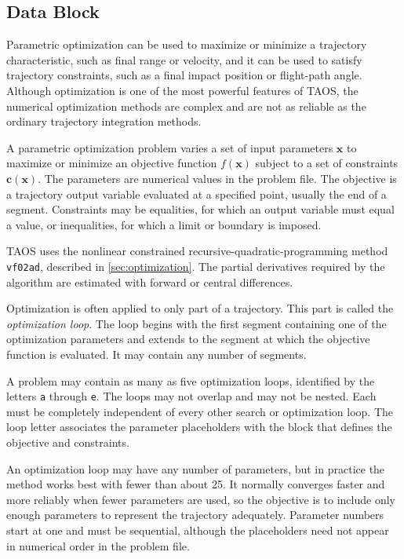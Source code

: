 \subsection{ Data Block}\label{sec:block-optimize}

Parametric optimization can be used to maximize or minimize a trajectory
characteristic, such as final range or velocity, and it can be used to satisfy
trajectory constraints, such as a final impact position or flight-path angle.
Although optimization is one of the most powerful features of TAOS, the numerical
optimization methods are complex and are not as reliable as the ordinary trajectory
integration methods.

A parametric optimization problem varies a set of input parameters
$\boldsymbol{x}$ to maximize or minimize an objective function
$f(\boldsymbol{x})$ subject to a set of constraints
$\boldsymbol{c}(\boldsymbol{x})$.  The parameters are numerical values in the
problem file.  The objective is a trajectory output variable evaluated at a specified
point, usually the end of a segment.  Constraints may be equalities, for which an
output variable must equal a value, or inequalities, for which a limit or boundary is
imposed.

TAOS uses the nonlinear constrained recursive-quadratic-programming method
\texttt{vf02ad}, described in \cref{sec:optimization}.  The partial
derivatives required by the algorithm are estimated with forward or central
differences.


Optimization is often applied to only part of a trajectory.  This part is called the
\emph{optimization loop}.  The loop begins with the first segment containing one of
the optimization parameters and extends to the segment at which the objective
function is evaluated.  It may contain any number of segments.

A problem may contain as many as five optimization loops, identified by the letters
\texttt{a} through \texttt{e}.  The loops may not overlap and may not be nested.
Each must be completely independent of every other search or optimization loop.
The loop letter associates the parameter placeholders with the
 block that defines the objective and constraints.

An optimization loop may have any number of parameters, but in practice the method
works best with fewer than about 25.  It normally converges faster and more reliably
when fewer parameters are used, so the objective is to include only enough
parameters to represent the trajectory adequately.  Parameter numbers start at one
and must be sequential, although the placeholders need not appear in numerical order
in the problem file.

